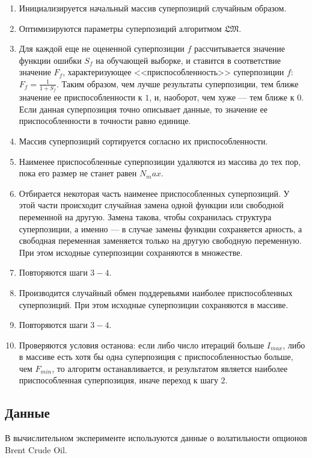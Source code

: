 \documentclass[12pt,a4paper]{amsart}
\begin{document}
\begin{enumerate}
  \item Инициализируется начальный массив суперпозиций случайным образом.
  \item Оптимизируются параметры суперпозиций алгоритмом $\mathfrak{LM}$.
  \item Для каждой еще не оцененной суперпозиции $f$ рассчитывается значение
	функции ошибки $S_f$ на обучающей выборке, и ставится в соответствие
	значение $F_f$, характеризующее <<приспособленность>> суперпозиции $f$:
	$F_f = \frac{1}{1 + S_f}$. Таким образом, чем лучше результаты суперпозиции,
	тем ближе значение ее приспособленности к $1$, и, наоборот, чем хуже ---
	тем ближе к $0$. Если данная суперпозиция точно описывает данные, то
	значение ее приспособленности в точности равно единице.
  \item Массив суперпозиций сортируется согласно их приспособленности.
  \item Наименее приспособленные суперпозиции удаляются из массива до тех
	пор, пока его размер не станет равен $N_max$.
  \item Отбирается некоторая часть наименее приспособленных суперпозиций.
	У этой части происходит случайная замена одной функции или свободной
	переменной на другую. Замена такова, чтобы сохранилась структура
	суперпозиции, а именно --- в случае замены функции сохраняется арность,
	а свободная переменная заменяется только на другую свободную переменную.
	При этом исходные суперпозиции сохраняются в множестве.
  \item Повторяются шаги $3-4$.
  \item Производится случайный обмен поддеревьями наиболее приспособленных
	суперпозиций. При этом исходные суперпозиции сохраняются в массиве.
  \item Повторяются шаги $3-4$.
  \item Проверяются условия останова: если либо число итераций больше
	$I_{max}$, либо в массиве есть хотя бы одна суперпозиция с
	приспособленностью больше, чем $F_{min}$, то алгоритм останавливается,
	и результатом является наиболее приспособленная суперпозиция, иначе
	переход к шагу $2$.
\end{enumerate}

\subsection{Данные}

В вычислительном эксперименте используются данные о волатильности опционов
Brent Crude Oil.
\end{document}

